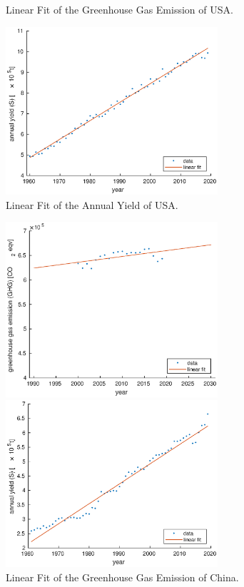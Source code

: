 \documentclass[12pt]{article}
\begin{document}
\begin{appendices}
\begin{figure}[htbp]
\begin{minipage}[t]{0.48\textwidth}
        \caption{Linear Fit of the Greenhouse Gas Emission of USA.}
    \end{minipage}
    \begin{minipage}[t]{0.48\textwidth}
        \centering
        \includegraphics[width=0.7\textwidth]{figure/model/USA/USA_yield_fit.eps}
        \caption{Linear Fit of the Annual Yield of USA.}
    \end{minipage}
\end{figure}
\begin{figure}[htbp]
    \centering
    \begin{minipage}[t]{0.48\textwidth}
        \centering
        \includegraphics[width=0.7\textwidth]{figure/model/China/China_GHG_fit.eps}
        \caption{Linear Fit of the Greenhouse Gas Emission of China.}
    \end{minipage}
    \begin{minipage}[t]{0.48\textwidth}
        \centering
        \includegraphics[width=0.7\textwidth]{figure/model/China/China_yield_fit.eps}

\end{minipage}
\end{figure}
\end{appendices}
\end{document}
